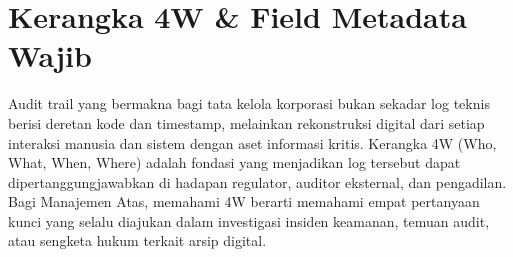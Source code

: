 \documentclass[12pt,a4paper]{report}
\begin{document}

\section{Kerangka 4W \& Field Metadata Wajib}
Audit trail yang bermakna bagi tata kelola korporasi bukan sekadar log teknis berisi deretan kode dan timestamp, melainkan rekonstruksi digital dari setiap interaksi manusia dan sistem dengan aset informasi kritis. Kerangka 4W (Who, What, When, Where) adalah fondasi yang menjadikan log tersebut dapat dipertanggungjawabkan di hadapan regulator, auditor eksternal, dan pengadilan. Bagi Manajemen Atas, memahami 4W berarti memahami empat pertanyaan kunci yang selalu diajukan dalam investigasi insiden keamanan, temuan audit, atau sengketa hukum terkait arsip digital.
\end{document}
